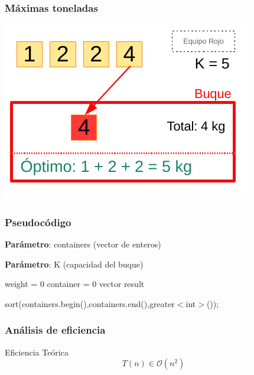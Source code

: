 \documentclass[13pt]{beamer}
\begin{document}
    \begin{frame}
		\frametitle{Máximas toneladas}
		\begin{center}
			\includegraphics[scale=1.5]{./img/DibCont2.pdf}
		\end{center}
	\end{frame}

	\begin{frame}
		\frametitle{Pseudocódigo}
		\begin{algorithm}[H]
			\begin{minipage}{0.92\textwidth}
		
			\textbf{Parámetro}: containers (vector de enteros)
		
			\textbf{Parámetro}: K (capacidad del buque)
		
			\end{minipage}
		
			weight = 0\;
			container = 0\;
			vector result\;
		  
			sort(containers.begin(),containers.end(),greater$<$int$>$());
		
		  
		
		\end{algorithm}
	\end{frame}

	\begin{frame}
		\frametitle{Análisis de eficiencia}
		\begin{block}{Eficiencia Teórica}
			$$T(n) \in \mathcal{O}(n^2)$$
		\end{block}
	\end{frame}
\end{document}
